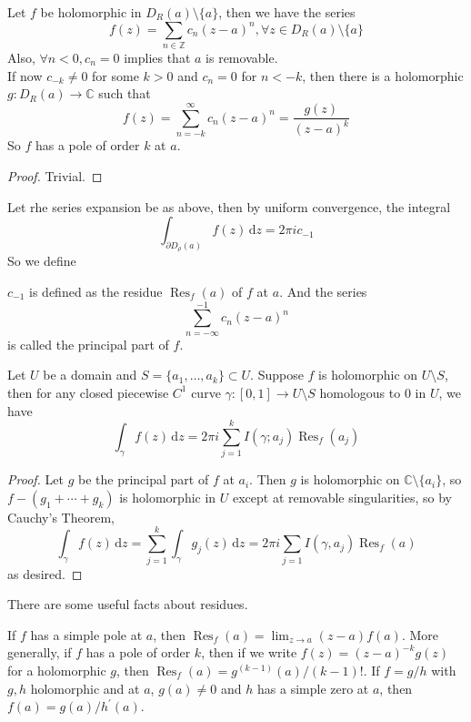 \begin{proposition}
    Let $f$ be holomorphic in $D_R(a)\setminus\{a\}$, then we have the series
    $$f(z)=\sum_{n\in\mathbb Z}c_n(z-a)^n,\forall z\in D_R(a)\setminus\{a\}$$
    Also, $\forall n<0,c_n=0$ implies that $a$ is removable.\\
    If now $c_{-k}\neq 0$ for some $k>0$ and $c_n=0$ for $n<-k$, then there is a holomorphic $g:D_R(a)\to\mathbb C$ such that
    $$f(z)=\sum_{n=-k}^\infty c_n(z-a)^n=\frac{g(z)}{(z-a)^k}$$
    So $f$ has a pole of order $k$ at $a$.
\end{proposition}
\begin{proof}
    Trivial.
\end{proof}
Let rhe series expansion be as above, then by uniform convergence, the integral
$$\int_{\partial D_\rho(a)}f(z)\,\mathrm dz=2\pi ic_{-1}$$
So we define
\begin{definition}
    $c_{-1}$ is defined as the residue $\operatorname{Res}_f(a)$ of $f$ at $a$.
    And the series
    $$\sum_{n=-\infty}^{-1}c_n(z-a)^n$$
    is called the principal part of $f$.
\end{definition}
\begin{theorem}
    Let $U$ be a domain and $S=\{a_1,\ldots,a_k\}\subset U$.
    Suppose $f$ is holomorphic on $U\setminus S$, then for any closed piecewise $C^1$ curve $\gamma:[0,1]\to U\setminus S$ homologous to $0$ in $U$, we have
    $$\int_\gamma f(z)\,\mathrm dz=2\pi i\sum_{j=1}^kI(\gamma;a_j)\operatorname{Res}_f(a_j)$$
\end{theorem}
\begin{proof}
    Let $g$ be the principal part of $f$ at $a_i$.
    Then $g$ is holomorphic on $\mathbb C\setminus\{a_i\}$, so $f-(g_1+\cdots+g_k)$ is holomorphic in $U$ except at removable singularities, so by Cauchy's Theorem,
    $$\int_\gamma f(z)\,\mathrm dz=\sum_{j=1}^k\int_\gamma g_j(z)\,\mathrm dz=2\pi i\sum_{j=1}I(\gamma,a_j)\operatorname{Res}_f(a)$$
    as desired.
\end{proof}
There are some useful facts about residues.
\begin{proposition}
    If $f$ has a simple pole at $a$, then $\operatorname{Res}_f(a)=\lim_{z\to a}(z-a)f(a)$.
    More generally, if $f$ has a pole of order $k$, then if we write $f(z)=(z-a)^{-k}g(z)$ for a holomorphic $g$, then $\operatorname{Res}_f(a)=g^{(k-1)}(a)/(k-1)!$.
    If $f=g/h$ with $g,h$ holomorphic and at $a$, $g(a)\neq 0$ and $h$ has a simple zero at $a$, then $f(a)=g(a)/h^\prime(a)$.
\end{proposition}

